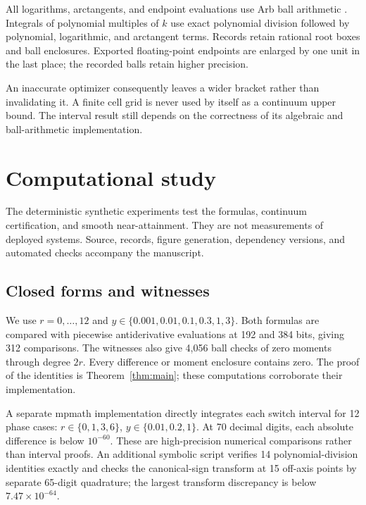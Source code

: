 \documentclass[11pt]{article}
\theoremstyle{remark}\newtheorem{remark}[theorem]{Remark}
\begin{document}
All logarithms, arctangents, and endpoint evaluations use Arb ball arithmetic
\cite{arb}. Integrals of polynomial multiples of $k$ use exact polynomial
division followed by polynomial, logarithmic, and arctangent terms.
Records retain rational root boxes and ball enclosures.
Exported floating-point endpoints are enlarged by one unit in the last place;
the recorded balls retain higher precision.

An inaccurate optimizer consequently leaves a wider bracket rather than
invalidating it. A finite cell grid is never used by itself as a continuum
upper bound. The interval result still depends on the correctness of its
algebraic and ball-arithmetic implementation.

\section{Computational study}\label{sec:experiments}
The deterministic synthetic experiments test the formulas, continuum
certification, and smooth near-attainment. They are not measurements of
deployed systems. Source, records, figure generation, dependency versions,
and automated checks accompany the manuscript.

\subsection{Closed forms and witnesses}
We use $r=0,\ldots,12$ and
$y\in\{0.001,0.01,0.1,0.3,1,3\}$.
Both formulas are compared with piecewise antiderivative evaluations at 192
and 384 bits, giving 312 comparisons.
The witnesses also give 4,056 ball checks of zero moments through degree
$2r$. Every difference or moment enclosure contains zero.
The proof of the identities is Theorem~\ref{thm:main};
these computations corroborate their implementation.

A separate mpmath implementation directly integrates each switch interval
for 12 phase cases:
$r\in\{0,1,3,6\}$, $y\in\{0.01,0.2,1\}$.
At 70 decimal digits, each absolute difference is below $10^{-60}$.
These are high-precision numerical comparisons rather than interval proofs.
An additional symbolic script verifies 14 polynomial-division identities exactly
and checks the canonical-sign transform at 15 off-axis points by separate
65-digit quadrature; the largest transform discrepancy is below $7.47\times10^{-64}$.

\begin{table}[t]
\centering
\caption{Exact-law values rounded to six decimals.
The moment count includes every degree from zero through $2r$.
Phase and gain columns have different attaining perturbations.}
\label{tab:budgets}
\end{table}
\end{document}
